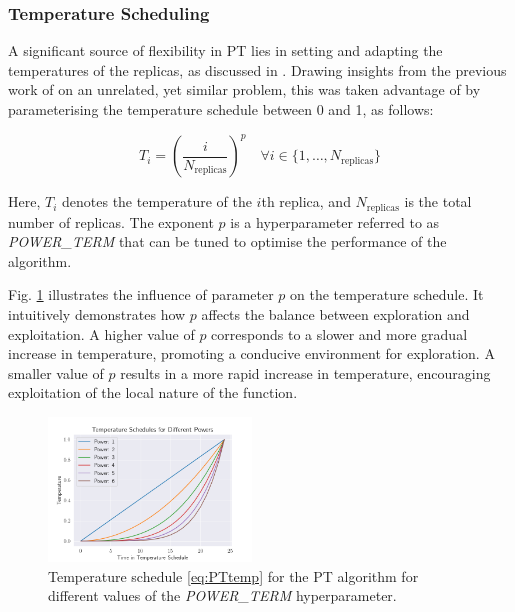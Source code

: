 \documentclass[10pt]{article}
\begin{document}
\begin{multicols}{2}
\subsubsection{Temperature Scheduling}

A significant source of flexibility in PT lies in setting and adapting the temperatures of the replicas, as discussed in \cite{Earl_2005}. Drawing insights from the previous work of \cite{CALDERHEAD20094028} on an unrelated, yet similar problem, this was taken advantage of by parameterising the temperature schedule between 0 and 1, as follows:

\begin{equation}
    T_i = \left(\frac{i}{{N_{\text{replicas}}}}\right)^p \quad \forall i \in \{1, \dots, N_{\text{replicas}}\}
    \label{eq:PTtemp}
\end{equation}

Here, $T_i$ denotes the temperature of the $i$th replica, and $N_{\text{replicas}}$ is the total number of replicas. The exponent $p$ is a hyperparameter referred to as \textit{POWER\_TERM} that can be tuned to optimise the performance of the algorithm. 

Fig. \ref{fig:PTtemp} illustrates the influence of parameter $p$ on the temperature schedule. It intuitively demonstrates how $p$ affects the balance between exploration and exploitation. A higher value of $p$ corresponds to a slower and more gradual increase in temperature, promoting a conducive environment for exploration. A smaller value of $p$ results in a more rapid increase in temperature, encouraging exploitation of the local nature of the function.

\begin{figure}[H]
    \centering
    \includegraphics[width=0.48\textwidth]{../figures/Permanent Images/Power_Progression.png}
    \captionsetup{justification=centering}
    \caption{Temperature schedule \ref{eq:PTtemp} for the PT algorithm for different values of the \textit{POWER\_TERM} hyperparameter.}
    \label{fig:PTtemp}
\end{figure}


\end{multicols}
\end{document}
